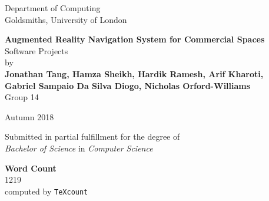 \documentclass[12pt]{report}
\newcommand\blankpage{%
    \null
    \thispagestyle{empty}%
    \addtocounter{page}{-1}%
    \newpage}
\begin{document}
\begin{titlepage}
    \begin{center}
         \vspace*{1cm}
        Department of Computing\\
        Goldsmiths, University of London\\
        
        \vspace*{3.75cm}
        
        \textbf{\Large Augmented Reality Navigation System for Commercial Spaces}\\
        \vspace*{0.25cm}           
        Software Projects\\  
    
        \vspace*{2cm}
        by\\
        \vspace*{0.25cm}    
        \textbf{Jonathan Tang, Hamza Sheikh, Hardik Ramesh, Arif Kharoti,\\}
        \textbf{Gabriel Sampaio Da Silva Diogo, Nicholas Orford-Williams}\\
        Group 14

        \vspace{2cm}
        
        Autumn 2018
        \vfill
        
        Submitted in partial fulfillment for the degree of\\
        \textit{Bachelor of Science} in \textit{Computer Science}
        
        \vspace{1.5cm}
        
    \end{center}
\end{titlepage}
\afterpage{\blankpage}
\thispagestyle{plain}

\begin{center}    
	\large
    \textbf{Word Count}\\
    1219\\
    computed by \texttt{TeXcount}
\end{center}
\end{document}
